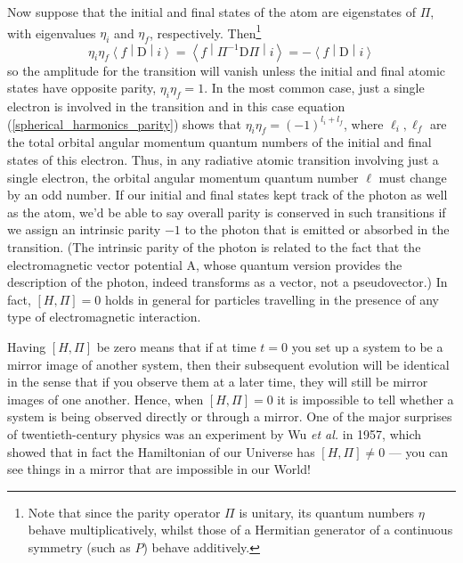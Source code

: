 \documentclass{article}
\theoremstyle{plain}\theoremheaderfont{\normalfont\itshape}\theorembodyfont{\rmfamily}\theoremseparator{.}\newtheorem*{rem}{Remark}\newtheorem*{ex}{Example}\newtheorem*{proof}{Proof}\newtheorem*{altp}{Alternative proof}
\theoremstyle{plain}\theoremheaderfont{\normalfont\bfseries}\theorembodyfont{\rmfamily}\theoremseparator{.}\newtheorem{thm}{Theorem}[section]\newtheorem{lem}[thm]{Lemma}\newtheorem{prop}[thm]{Proposition}\newtheorem*{cor}{Corollary}\newtheorem{defn}[thm]{Definition}\newtheorem{clm}[thm]{Claim}\newtheorem{clminproof}{Claim}
\theoremstyle{break}\theoremheaderfont{\normalfont\itshape}\theorembodyfont{\rmfamily}\theoremseparator{.\medskip}\newtheorem*{proofskip}{Proof}\newtheorem*{exs}{Examples}\newtheorem*{rems}{Remarks}
\theoremstyle{break}\theoremheaderfont{\normalfont\bfseries}\theorembodyfont{\rmfamily}\theoremseparator{.\medskip}\newtheorem{lemskip}[thm]{Lemma}\newtheorem{defnskip}[thm]{Definition}\newtheorem{propskip}[thm]{Proposition}\newtheorem{thmskip}[thm]{Theorem}
\numberwithin{equation}{section}
\newcommand{\mel}[3]{\left\langle #1 \middle| #2 \middle| #3 \right\rangle}
\newcommand{\vb}[1]{\bm{\mathrm{#1}}}
\begin{document}
    Now suppose that the initial and final states of the atom are eigenstates of \(\Pi\), with eigenvalues \(\eta_i\) and \(\eta_f\), respectively. Then\footnote{Note that since the parity operator \(\Pi\) is unitary, its quantum numbers \(\eta\) behave multiplicatively, whilst those of a Hermitian generator of a continuous symmetry (such as \(P\)) behave additively.}
    \begin{equation}
        \eta_i\eta_f\mel{f}{\vb{D}}{i}=\mel{f}{\Pi^{-1}\vb{D}\Pi}{i}=-\mel{f}{\vb{D}}{i}
    \end{equation}
    so the amplitude for the transition will vanish unless the initial and final atomic states have opposite parity, \(\eta_i\eta_f=1\). In the most common case, just a single electron is involved in the transition and in this case equation (\ref{spherical_harmonics_parity}) shows that \(\eta_i\eta_f=(-1)^{l_i+l_f}\), where \(\ell_i,\ell_f\) are the total orbital angular momentum quantum numbers of the initial and final states of this electron. Thus, in any radiative atomic transition involving just a single electron, the orbital angular momentum quantum number \(\ell\) must change by an odd number. If our initial and final states kept track of the photon as well as the atom, we'd be able to say overall parity is conserved in such transitions if we assign an intrinsic parity \(-1\) to the photon that is emitted or absorbed in the transition. (The intrinsic parity of the photon is related to the fact that the electromagnetic vector potential \(\vb{A}\), whose quantum version provides the description of the photon, indeed transforms as a vector, not a pseudovector.) In fact, \([H,\Pi]=0\) holds in general for particles travelling in the presence of any type of electromagnetic interaction.

    Having \([H,\Pi]\) be zero means that if at time \(t=0\) you set up a system to be a mirror image of another system, then their subsequent evolution will be identical in the sense that if you observe them at a later time, they will still be mirror images of one another. Hence, when \([H,\Pi]=0\) it is impossible to tell whether a system is being observed directly or through a mirror. One of the major surprises of twentieth-century physics was an experiment by Wu \textit{et al.} in 1957, which showed that in fact the Hamiltonian of our Universe has \([H,\Pi]\ne 0\) --- you can see things in a mirror that are impossible in our World!

    \newpage
\end{document}
